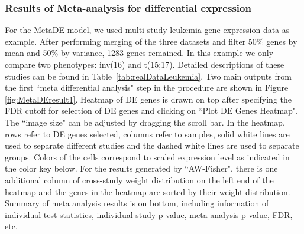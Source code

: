 \subsubsection{Results of Meta-analysis for differential expression}

For the MetaDE model, we used multi-study leukemia gene expression data as example.
After performing merging of the three datasets and filter 50\% genes by mean and 50\% by variance, 1283 genes remained.
In this example we only compare two phenotypes: inv(16) and t(15;17).
Detailed descriptions of these studies can be found in Table~\ref{tab:realDataLeukemia}. 
Two main outputs from the first ``meta differential analysis" step in the procedure are shown in Figure \ref{fig:MetaDEresult1}. 
Heatmap of DE genes is drawn on top after specifying the FDR cutoff for selection of DE genes and clicking on ``Plot DE Genes Heatmap". 
The ``image size" can be adjusted by dragging the scroll bar. 
In the heatmap, rows refer to DE genes selected, columns refer to samples, solid white lines are used to separate different studies and the dashed white lines are used to separate groups. 
Colors of the cells correspond to scaled expression level as indicated in the color key below. 
For the results generated by ``AW-Fisher", there is one additional column of cross-study weight distribution on the left end of the heatmap and the genes in the heatmap are sorted by their weight distribution.
Summary of meta analysis results is on bottom, 
including information of individual test statistics, individual study p-value, meta-analysis p-value, FDR, etc. 


